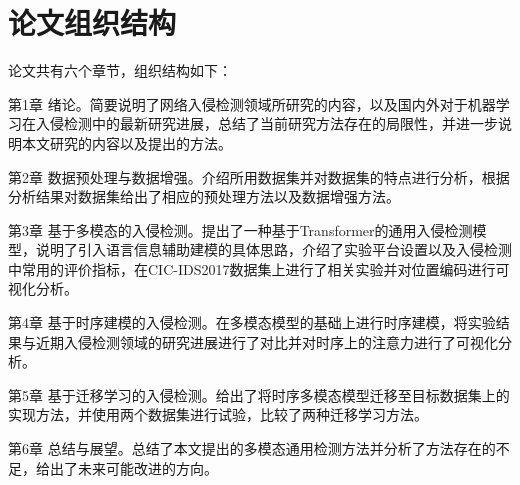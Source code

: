 \section{论文组织结构}
\label{sec:Paper organization structure}
论文共有六个章节，组织结构如下：

第1章 绪论。简要说明了网络入侵检测领域所研究的内容，以及国内外对于机器学习在入侵检测中的最新研究进展，总结了当前研究方法存在的局限性，并进一步说明本文研究的内容以及提出的方法。

第2章 数据预处理与数据增强。介绍所用数据集并对数据集的特点进行分析，根据分析结果对数据集给出了相应的预处理方法以及数据增强方法。

第3章 基于多模态的入侵检测。提出了一种基于Transformer的通用入侵检测模型，说明了引入语言信息辅助建模的具体思路，介绍了实验平台设置以及入侵检测中常用的评价指标，在CIC-IDS2017数据集上进行了相关实验并对位置编码进行可视化分析。

第4章 基于时序建模的入侵检测。在多模态模型的基础上进行时序建模，将实验结果与近期入侵检测领域的研究进展进行了对比并对时序上的注意力进行了可视化分析。

第5章 基于迁移学习的入侵检测。给出了将时序多模态模型迁移至目标数据集上的实现方法，并使用两个数据集进行试验，比较了两种迁移学习方法。

第6章 总结与展望。总结了本文提出的多模态通用检测方法并分析了方法存在的不足，给出了未来可能改进的方向。
